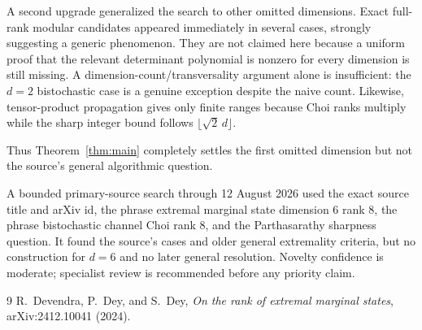 \documentclass[11pt]{article}
\theoremstyle{remark}
\begin{document}
A second upgrade generalized the search to other omitted dimensions.  Exact
full-rank modular candidates appeared immediately in several cases, strongly
suggesting a generic phenomenon.  They are not claimed here because a
uniform proof that the relevant determinant polynomial is nonzero for every
dimension is still missing.  A dimension-count/transversality argument alone
is insufficient: the \(d=2\) bistochastic case is a genuine exception despite
the naive count.  Likewise, tensor-product propagation gives only finite
ranges because Choi ranks multiply while the sharp integer bound follows
\(\lfloor\sqrt2\,d\rfloor\).

Thus Theorem~\ref{thm:main} completely settles the first omitted dimension
but not the source's general algorithmic question.

A bounded primary-source search through 12 August 2026 used the exact source
title and arXiv id, the phrase extremal marginal state dimension 6 rank 8,
the phrase bistochastic channel Choi rank 8, and the Parthasarathy sharpness
question.  It found the source's cases and older general extremality
criteria, but no construction for \(d=6\) and no later general resolution.
Novelty confidence is moderate; specialist review is recommended before any
priority claim.

\begin{thebibliography}{9}
R.~Devendra, P.~Dey, and S.~Dey,
\emph{On the rank of extremal marginal states},
arXiv:2412.10041 (2024).
\end{thebibliography}
\end{document}
